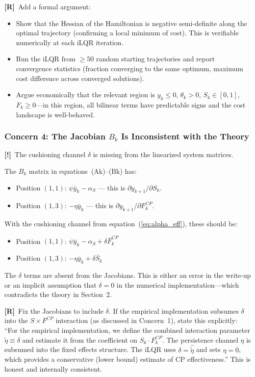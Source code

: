 \documentclass[12pt, a4paper]{article}
\newcommand{\concern}[1]{\textcolor{concern}{\textbf{[!]}~#1}}
\newcommand{\recommend}[1]{\textcolor{recommend}{\textbf{[R]}~#1}}
\begin{document}
\recommend{Add a formal argument:}
\begin{itemize}
    \item Show that the Hessian of the Hamiltonian is negative semi-definite along the optimal trajectory (confirming a local minimum of cost). This is verifiable numerically at each iLQR iteration.
    \item Run the iLQR from $\geq 50$ random starting trajectories and report convergence statistics (fraction converging to the same optimum, maximum cost difference across converged solutions).
    \item Argue economically that the relevant region is $y_k \leq 0$, $\theta_k > 0$, $S_k \in [0, 1]$, $F_k \geq 0$---in this region, all bilinear terms have predictable signs and the cost landscape is well-behaved.
\end{itemize}


\subsubsection*{Concern 4: The Jacobian $B_k$ Is Inconsistent with the Theory}

\concern{The cushioning channel $\delta$ is missing from the linearized system matrices.}

The $B_k$ matrix in equations~(Ak)--(Bk) has:
\begin{itemize}
    \item Position $(1,1)$: $\psi \bar{y}_k - \alpha_S$ --- this is $\partial y_{k+1} / \partial S_k$.
    \item Position $(1,3)$: $-\eta \bar{y}_k$ --- this is $\partial y_{k+1} / \partial F_k^{CP}$.
\end{itemize}

With the cushioning channel from equation~(\ref{eq:alpha_eff}), these should be:
\begin{itemize}
    \item Position $(1,1)$: $\psi \bar{y}_k - \alpha_S + \delta \bar{F}_k^{CP}$
    \item Position $(1,3)$: $-\eta \bar{y}_k + \delta \bar{S}_k$
\end{itemize}

The $\delta$ terms are absent from the Jacobians. This is either an error in the write-up or an implicit assumption that $\delta = 0$ in the numerical implementation---which contradicts the theory in Section~2.

\recommend{Fix the Jacobians to include $\delta$.} If the empirical implementation subsumes $\delta$ into the $S \times F^{CP}$ interaction (as discussed in Concern~1), state this explicitly: ``For the empirical implementation, we define the combined interaction parameter $\tilde{\eta} \equiv \delta$ and estimate it from the coefficient on $S_k \cdot F_k^{CP}$. The persistence channel $\eta$ is subsumed into the fixed effects structure. The iLQR uses $\delta = \hat{\tilde{\eta}}$ and sets $\eta = 0$, which provides a conservative (lower bound) estimate of CP effectiveness.'' This is honest and internally consistent.
\end{document}
